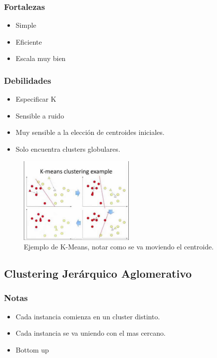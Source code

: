 \documentclass[titlepage,a4paper]{article}
\begin{document}
\subsubsection*{Fortalezas}
\begin{itemize}
    \item Simple
    \item Eficiente
    \item Escala muy bien
\end{itemize}

\subsubsection*{Debilidades}
\begin{itemize}
    \item Especificar K
    \item Sensible a ruido
    \item Muy sensible a la elección de centroides iniciales.
    \item Solo encuentra clusters globulares.
\end{itemize}


\begin{figure}[!htb]
    \centering
    \includegraphics[width=0.5\textwidth]{imagenesResumen/K-Means.jpg}
    \caption{Ejemplo de K-Means, notar como se va moviendo el centroide.}
\end{figure}

\newpage

\subsection{Clustering Jerárquico Aglomerativo}
\subsubsection*{Notas}
\begin{itemize}
    \item Cada instancia comienza en un cluster distinto.
    \item Cada instancia se va uniendo con el mas cercano.
    \item Bottom up
\end{itemize}
\end{document}
